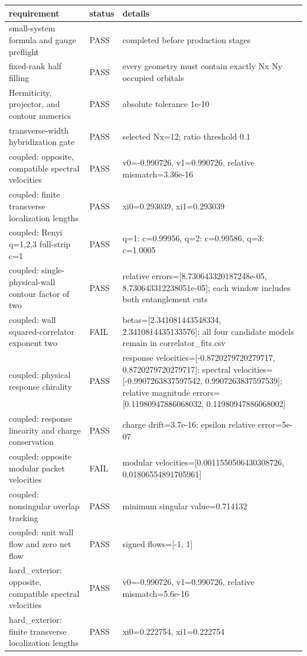 \documentclass[aps,prb,onecolumn,nofootinbib,superscriptaddress]{revtex4-2}
\begin{document}
\begin{longtable}{p{}p{}p{}}
\toprule
requirement & status & details \\
\midrule
small-system formula and gauge preflight & PASS & completed before production stages \\
fixed-rank half filling & PASS & every geometry must contain exactly Nx Ny occupied orbitals \\
Hermiticity, projector, and contour numerics & PASS & absolute tolerance 1e-10 \\
transverse-width hybridization gate & PASS & selected Nx=12; ratio threshold 0.1 \\
coupled: opposite, compatible spectral velocities & PASS & v0=-0.990726, v1=0.990726, relative mismatch=3.36e-16 \\
coupled: finite transverse localization lengths & PASS & xi0=0.293039, xi1=0.293039 \\
coupled: Renyi q=1,2,3 full-strip c=1 & PASS & q=1: c=0.99956, q=2: c=0.99586, q=3: c=1.0005 \\
coupled: single-physical-wall contour factor of two & PASS & relative errors=[8.730643320187248e-05, 8.730643312238051e-05]; each window includes both entanglement cuts \\
coupled: wall squared-correlator exponent two & FAIL & betas=[2.341081443548334, 2.3410814435133576]; all four candidate models remain in correlator\_fits.csv \\
coupled: physical response chirality & PASS & response velocities=[-0.8720279720279717, 0.8720279720279717]; spectral velocities=[-0.9907263837597542, 0.9907263837597539]; relative magnitude errors=[0.11980947886068032, 0.11980947886068002] \\
coupled: response linearity and charge conservation & PASS & charge drift=3.7e-16; epsilon relative error=5e-07 \\
coupled: opposite modular packet velocities & FAIL & modular velocities=[0.0011550506430308726, 0.01806554891705961] \\
coupled: nonsingular overlap tracking & PASS & minimum singular value=0.714132 \\
coupled: unit wall flow and zero net flow & PASS & signed flows=[-1, 1] \\
hard\_exterior: opposite, compatible spectral velocities & PASS & v0=-0.990726, v1=0.990726, relative mismatch=5.6e-16 \\
hard\_exterior: finite transverse localization lengths & PASS & xi0=0.222754, xi1=0.222754 \\

\end{longtable}
\end{document}
